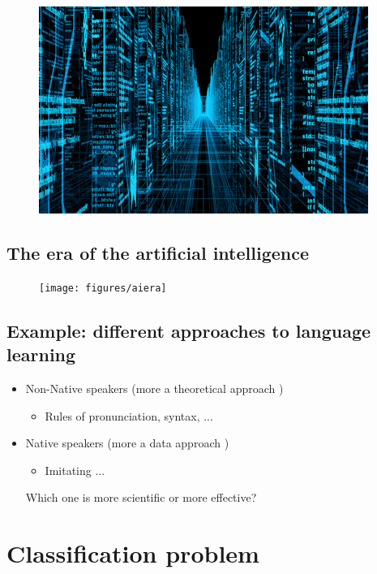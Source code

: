 \begin{figure}[H]
{\begin{minipage}[b]{0.45\textwidth}
\includegraphics[width=\textwidth]{Data}
\end{minipage}
}
\end{figure}





\subsection{The era of the artificial intelligence}
\begin{figure}[H]
\centering
\texttt{[image: figures/aiera]}
\end{figure}


\subsection{Example: different approaches to language learning}
\begin{itemize}
	\item Non-Native speakers (more a theoretical approach )
	\begin{itemize}
	\item Rules of pronunciation,  syntax, ...
	\end{itemize}
    \item Native speakers (more a data approach )
	\begin{itemize}
	\item Imitating ...
	\end{itemize}
Which one is more scientific or more effective?
\end{itemize}



\section{Classification problem }
